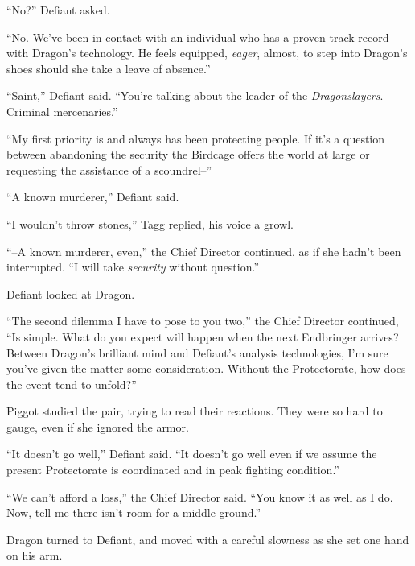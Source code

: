 ``No?'' Defiant asked.



``No.  We've been in contact with an individual who has a proven track record with Dragon's technology.  He feels equipped, \emph{eager}, almost, to step into Dragon's shoes should she take a leave of absence.''



``Saint,'' Defiant said.  ``You're talking about the leader of the \emph{Dragonslayers}.  Criminal mercenaries.''



``My first priority is and always has been protecting people.  If it's a question between abandoning the security the Birdcage offers the world at large or requesting the assistance of a scoundrel--''



``A known murderer,'' Defiant said.



``I wouldn't throw stones,'' Tagg replied, his voice a growl.



``--A known murderer, even,'' the Chief Director continued, as if she hadn't been interrupted.  ``I will take \emph{security} without question.''



Defiant looked at Dragon.



``The second dilemma I have to pose to you two,'' the Chief Director continued, ``Is simple.  What do you expect will happen when the next Endbringer arrives?  Between Dragon's brilliant mind and Defiant's analysis technologies, I'm sure you've given the matter some consideration.  Without the Protectorate, how does the event tend to unfold?''



Piggot studied the pair, trying to read their reactions.  They were so hard to gauge, even if she ignored the armor.



``It doesn't go well,'' Defiant said.  ``It doesn't go well even if we assume the present Protectorate is coordinated and in peak fighting condition.''



``We can't afford a loss,'' the Chief Director said.  ``You know it as well as I do.  Now, tell me there isn't room for a middle ground.''



Dragon turned to Defiant, and moved with a careful slowness as she set one hand on his arm.



